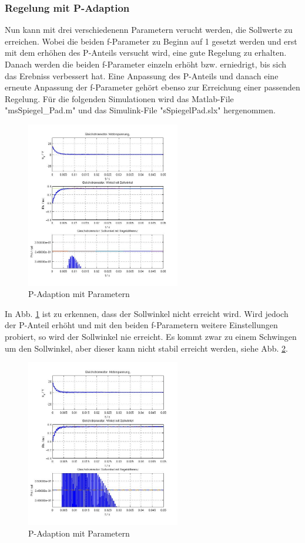 \subsubsection{Regelung mit P-Adaption}
\label{chap:p_adaption}
Nun kann mit drei verschiedenenn Parametern verucht werden, die Sollwerte zu erreichen.
Wobei die beiden f-Parameter zu Beginn auf 1 gesetzt werden und erst mit dem erhöhen des P-Anteils versucht wird, eine gute Regelung zu erhalten. 
Danach werden die beiden f-Parameter einzeln erhöht bzw. erniedrigt, bis sich das Erebniss verbessert hat. 
Eine Anpassung des P-Anteils und danach eine erneute Anpassung der f-Parameter gehört ebenso zur Erreichung einer passenden Regelung.
Für die folgenden Simulationen wird das Matlab-File "msSpiegel_Pad.m" und das Simulink-File "sSpiegelPad.slx" hergenommen.
\begin{figure}[!h]
	\centering
	\includegraphics[width=0.6\textwidth]{Pad-P41F1_1,5F2_80.jpg}
	\caption{P-Adaption mit Parametern}
	\label{fig:padp41f1580}
\end{figure}
In Abb. \ref{fig:padp41f1580} ist zu erkennen, dass der Sollwinkel nicht erreicht wird. 
Wird jedoch der P-Anteil erhöht und mit den beiden f-Parametern weitere Einstellungen probiert, so wird der Sollwinkel nie erreicht. 
Es kommt zwar zu einem Schwingen um den Sollwinkel, aber dieser kann nicht stabil erreicht werden, siehe Abb. \ref{fig:padp50f3400}.
\begin{figure}[!h]
	\centering
	\includegraphics[width=0.6\textwidth]{Pad-P50F1_3F2_400.jpg}
	\caption{P-Adaption mit Parametern}
	\label{fig:padp50f3400}
\end{figure}

